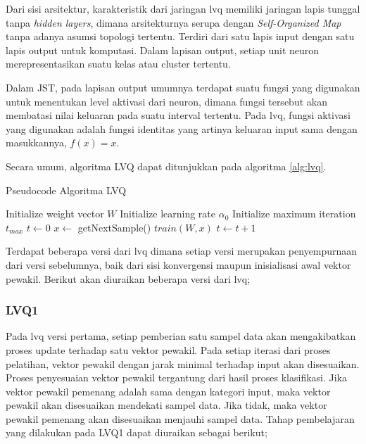 Dari sisi arsitektur, karakteristik dari jaringan \gls{lvq} memiliki jaringan
lapis tunggal tanpa \textit{hidden layers}, dimana arsitekturnya serupa dengan
\textit{Self-Organized Map} tanpa adanya asumsi topologi tertentu. Terdiri dari
satu lapis input dengan satu lapis output untuk komputasi. Dalam lapisan output,
setiap unit neuron merepresentasikan suatu kelas atau cluster tertentu.

Dalam JST, pada lapisan output umumnya terdapat suatu fungsi yang digunakan
untuk menentukan level aktivasi dari neuron, dimana fungsi tersebut akan
membatasi nilai keluaran pada suatu interval tertentu. Pada \gls{lvq}, fungsi
aktivasi yang digunakan adalah fungsi identitas yang artinya keluaran input sama
dengan masukkannya, $f(x) = x$.

\noindent
Secara umum, algoritma LVQ dapat ditunjukkan pada algoritma \ref{alg:lvq}.

\begin{algorithm}  
\scriptsize 
\caption{Pseudocode Algoritma LVQ}          
\label{alg:lvq}                           
\begin{algorithmic}                    %
	\STATE Initialize weight vector $W$
	\STATE Initialize learning rate $\alpha_0$
	\STATE Initialize maximum iteration $t_{max}$
	\STATE $t \leftarrow 0$
		\STATE $x \leftarrow $ getNextSample()
		\STATE $train(W, x)$ %
		\STATE $t \leftarrow t + 1$
	\ENDWHILE
\end{algorithmic}
\end{algorithm}
 
Terdapat beberapa versi dari \gls{lvq} dimana setiap versi merupakan
penyempurnaan dari versi sebelumnya, baik dari sisi konvergensi 
maupun inisialisasi awal vektor pewakil. Berikut akan diuraikan beberapa versi
dari \gls{lvq};

\subsubsection*{LVQ1}
Pada \gls{lvq} versi pertama, setiap pemberian satu sampel data akan
mengakibatkan proses update terhadap satu vektor pewakil. Pada setiap iterasi
dari proses pelatihan, vektor pewakil dengan jarak minimal terhadap input akan
disesuaikan. Proses penyesuaian vektor pewakil tergantung dari hasil proses
klasifikasi. Jika vektor pewakil pemenang adalah sama dengan kategori input,
maka vektor pewakil akan disesuaikan mendekati sampel data. Jika tidak, maka
vektor pewakil pemenang akan disesuaikan menjauhi sampel data. Tahap
pembelajaran yang dilakukan pada LVQ1 dapat diuraikan sebagai berikut;

